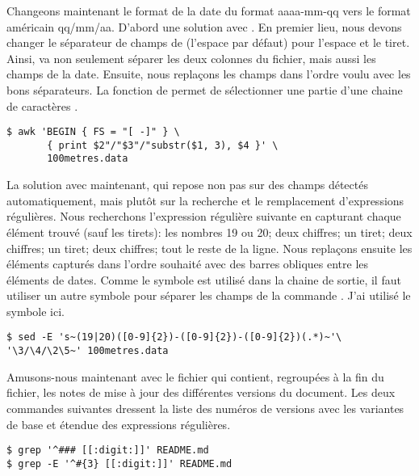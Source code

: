 Changeons maintenant le format de la date du format
 aaaa-mm-qq
vers le format américain qq/mm/aa. D'abord une solution avec
. En premier lieu, nous devons changer le séparateur de
champs de  (l'espace par défaut) pour l'espace et le tiret.
Ainsi,  va non seulement séparer les deux colonnes du
fichier, mais aussi les champs de la date. Ensuite, nous replaçons les
champs dans l'ordre voulu avec les bons séparateurs. La fonction
 de  permet
de sélectionner une partie d'une chaine de caractères
\citep[section~9.1.3]{awk}.
\begin{Schunk}
\begin{Verbatim}
$ awk 'BEGIN { FS = "[ -]" } \
       { print $2"/"$3"/"substr($1, 3), $4 }' \
       100metres.data
\end{Verbatim}
\end{Schunk}

La solution avec  maintenant, qui repose non pas sur des
champs détectés automatiquement, mais plutôt sur la recherche et le
remplacement d'expressions régulières. Nous recherchons l'expression
régulière suivante en capturant chaque élément trouvé (sauf les
tirets): les nombres 19 ou 20; deux chiffres; un tiret; deux chiffres;
un tiret; deux chiffres; tout le reste de la ligne. Nous replaçons
ensuite les éléments capturés dans l'ordre souhaité avec des barres
obliques \code{/} entre les éléments de dates. Comme le symbole
\code{/} est utilisé dans la chaine de sortie, il faut utiliser un
autre symbole pour séparer les champs de la commande \code{sed}. J'ai
utilisé le symbole \code{~} ici.
\begin{Schunk}
\begin{Verbatim}
$ sed -E 's~(19|20)([0-9]{2})-([0-9]{2})-([0-9]{2})(.*)~'\
'\3/\4/\2\5~' 100metres.data
\end{Verbatim}
\end{Schunk}

Amusons-nous maintenant avec le fichier  qui contient,
regroupées à la fin du fichier, les notes de mise à jour des différentes
versions du document. Les deux commandes suivantes dressent la liste
des numéros de versions avec les variantes de base et étendue
des expressions régulières.
\begin{Schunk}
\begin{Verbatim}
$ grep '^### [[:digit:]]' README.md
$ grep -E '^#{3} [[:digit:]]' README.md
\end{Verbatim}
\end{Schunk}

